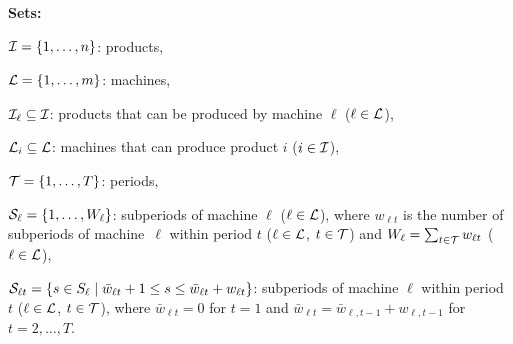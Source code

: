 \documentclass[11pt]{article}
\begin{document}
\noindent
\textbf{Sets:}
\begin{description}[topsep=2pt,itemsep=1pt]
\item[]${\cal I} = \{ 1, \dots, n\}$: products,
\item[]${\cal L} = \{ 1, \dots, m\}$: machines,
\item[]${\cal I}_{\ell} \subseteq {\cal I}$: products that can be produced by machine $\ell$ ($\ell \in {\cal L}$),
\item[]${\cal L}_i \subseteq {\cal L}$: machines that can produce product $i$ ($i \in {\cal I}$),
\item[]${\cal T} = \{ 1, \dots, T\}$: periods,
\item[]${\cal S}_{\ell} = \{ 1, \dots, W_{\ell} \}$: subperiods of machine $\ell$ ($\ell \in {\cal L}$), where $w_{\ell t}$ is the number of subperiods of machine~$\ell$ within period $t$ ($\ell \in {\cal L}$, $t \in {\cal T}$) and $W_{\ell} = \sum_{t \in {\cal T}} w_{\ell t}$ ($\ell \in {\cal L}$),
\item[]${\cal S}_{\ell t} = \{ s \in S_{\ell} \; | \; \bar w_{\ell t} + 1 \leq s \leq \bar w_{\ell t} + w_{\ell t}\}$: subperiods of machine $\ell$ within period $t$ ($\ell \in {\cal L}$, $t \in {\cal T}$), where $\bar w_{\ell t} = 0$ for $t=1$ and $\bar w_{\ell t} = \bar w_{\ell,t-1} + w_{\ell,t-1}$ for $t = 2,\dots,T$.
\end{description}
\end{document}

